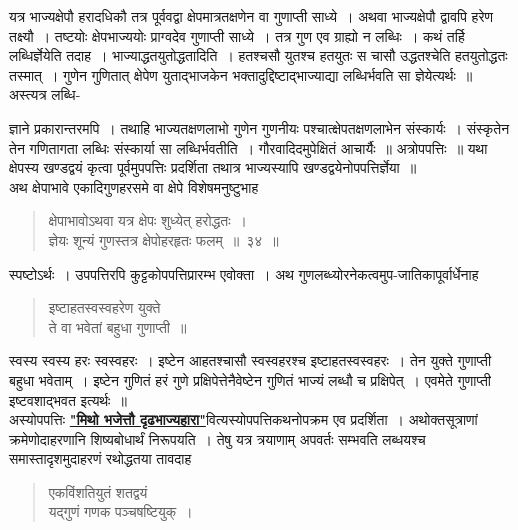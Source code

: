 \documentclass[11pt, openany]{book}
\begin{document}
 यत्र भाज्यक्षेपौ हरादधिकौ तत्र पूर्ववद्वा क्षेपमात्रतक्षणेन वा 
गुणाप्ती साध्ये~। अथवा भाज्यक्षेपौ द्वावपि हरेण तक्ष्यौ~। तष्टयोः
क्षेपभाज्ययोः प्राग्वदेव गुणाप्ती साध्ये~। तत्र गुण एव ग्राह्यो न लब्धिः~। 
कथं तर्हि लब्धिर्ज्ञेयेति तदाह~। भाज्याद्धतयुतोद्धतादिति~। हतश्चसौ युतश्च 
हतयुतः स चासौ उद्धतश्चेति हतयुतोद्धतः तस्मात्~। गुणेन गुणितात् क्षेपेण
युताद्भाजकेन भक्तादुद्दिष्टाद्भाज्याद्या लब्धिर्भवति सा ज्ञेयेत्यर्थः~॥ अस्त्यत्र लब्धि-

\newpage%

\noindent ज्ञाने प्रकारान्तरमपि~। तथाहि भाज्यतक्षणलाभो गुणेन गुणनीयः
पश्चात्क्षेपतक्षणलाभेन संस्कार्यः~। संस्कृतेन तेन गणितागता लब्धिः संस्कार्या 
सा लब्धिर्भवतीति~। गौरवादिदमुपेक्षितं आचार्यैः~॥ अत्रोपपत्तिः~॥ यथा
क्षेपस्य खण्डद्वयं कृत्वा पूर्वमुपपत्तिः प्रदर्शिता तथात्र भाज्यस्यापि खण्डद्वयेनोपपत्तिर्ज्ञेया~॥ \\

\vspace{-3mm}
 अथ क्षेपाभावे एकादिगुणहरसमे वा क्षेपे विशेषमनुष्टुभाह\textendash  

 \label{34}
\begin{quote}
    \bs
     क्षेपाभावोऽथवा यत्र क्षेपः शुध्येत् हरोद्धतः~।\\ 
 
\vspace{-7mm}
\hspace{1cm} ज्ञेयः शून्यं गुणस्तत्र क्षेपोहरहृतः फलम्~॥~३४~॥ 
\end{quote}

 स्पष्टोऽर्थः~। उपपत्तिरपि कुट्टकोपपत्तिप्रारम्भ एवोक्ता~। अथ
गुणलब्ध्योरनेकत्वमुप-जातिकापूर्वार्धेनाह\textendash 

 \label{35.1}
\begin{quote}
    \bs
 इष्टाहतस्वस्वहरेण युक्ते \\

\vspace{-7mm}
\hspace{1cm} ते वा भवेतां बहुधा गुणाप्ती~॥ 
\end{quote}

 स्वस्य स्वस्य हरः स्वस्वहरः~। इष्टेन आहतश्चासौ स्वस्वहरश्च 
इष्टाहतस्वस्वहरः~। तेन युक्ते गुणाप्ती बहुधा भवेताम्~। इष्टेन गुणितं 
हरं गुणे प्रक्षिपेत्तेनैवेष्टेन गुणितं भाज्यं लब्धौ च प्रक्षिपेत्~।
एवमेते गुणाप्ती इष्टवशाद्भवत इत्यर्थः~॥ \\

\vspace{-3mm}
 अस्योपपत्तिः \hyperref[27]{\textbf{"मिथो भजेत्तौ दृढभाज्यहारा"}}वित्यस्योपपत्तिकथनोपक्रम एव प्रदर्शिता~। अथोक्तसूत्राणां क्रमेणोदाहरणानि शिष्यबोधार्थं निरूपयति~। तेषु यत्र त्रयाणाम् अपवर्तः सम्भवति लब्धयश्च समास्तादृशमुदाहरणं रथोद्धतया तावदाह\textendash 
\begin{quote}
    \ex
     एकविंशतियुतं शतद्वयं \\

\vspace{-7mm}
\hspace{1cm} यद्गुणं गणक पञ्चषष्टियुक्~।
\end{quote}
\end{document}

